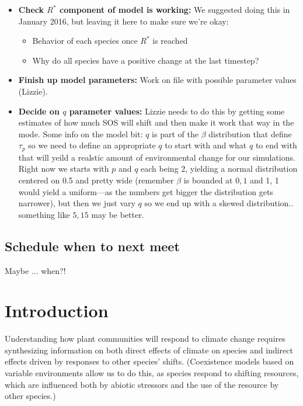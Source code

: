 \documentclass[11pt,a4paper,oneside]{article}
\begin{document}
\begin{itemize}
\item {\bf Check $R^{*}$ component of model is working:} We suggested doing this in January 2016, but leaving it here to make sure we're okay:
\begin{itemize}
\item Behavior of each species once $R^{*}$ is reached
\item Why do all species have a positive change at the last timestep?
\end{itemize}
\item {\bf Finish up model parameters:} Work on file with possible parameter values (Lizzie). 
\item {\bf Decide on $q$ parameter values:}
Lizzie needs to do this by getting some estimates of how much SOS will shift and then make it work that way in the mode. Some info on the model bit: $q$ is part of the $\beta$ distribution that define $\tau_{p}$ so we need to define an appropriate $q$ to start with and what $q$ to end with that will yeild a realstic amount of environmental change for our simulations. Right now we starts with $p$ and $q$ each being 2, yielding a normal distribution centered on 0.5 and pretty wide (remember $\beta$ is bounded at $0,1$ and 1, 1 would yield a uniform---as the numbers get bigger the distribution gets narrower), but then we just vary $q$ so we end up with a skewed distribution.. something like $5,15$ may be better.
\end{itemize}


\subsection{Schedule when to next meet}
Maybe ... when?!


\newpage
\section{Introduction}
\noindent Understanding how plant communities will respond to climate change
requires synthesizing information on both direct effects of climate on species
and indirect effects driven by responses to other species'
shifts. (Coexistence models based on variable environments allow us to
do this, as species respond to shifting resources, which are
influenced both by abiotic stressors and the use of the resource by
other species.)
\end{document}
